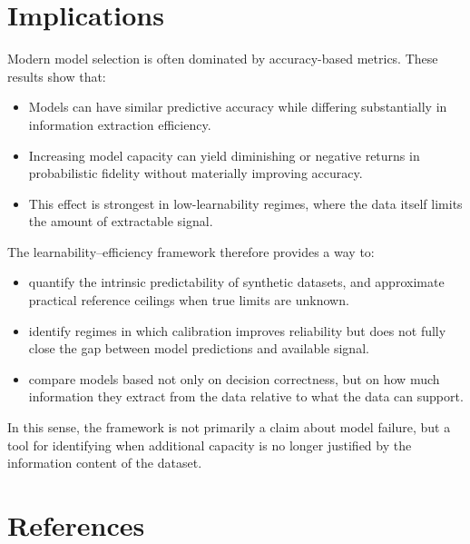 \documentclass{article}
\begin{document}
\section{Implications}

Modern model selection is often dominated by accuracy-based metrics. These results show that:

\begin{itemize}
    \item Models can have similar predictive accuracy while differing substantially in information extraction efficiency.
    \item Increasing model capacity can yield diminishing or negative returns in probabilistic fidelity without materially improving accuracy.
    \item This effect is strongest in low-learnability regimes, where the data itself limits the amount of extractable signal.
\end{itemize}
The learnability--efficiency framework therefore provides a way to:
\begin{itemize}
    \item quantify the intrinsic predictability of synthetic datasets, and approximate practical reference ceilings when true limits are unknown.
    \item identify regimes in which calibration improves reliability but does not fully close the gap between model predictions and available signal.
    \item compare models based not only on decision correctness, but on how much information they extract from the data relative to what the data can support.
\end{itemize}
In this sense, the framework is not primarily a claim about model failure, but a tool for identifying when additional capacity is no longer justified by the information content of the dataset.




\section{References}


\end{document}
